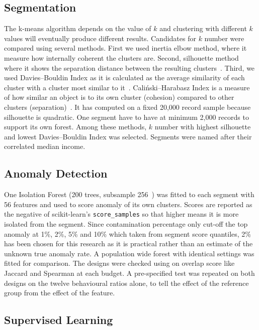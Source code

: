 \subsection{Segmentation}

The k-means algorithm depends on the value of $k$ and clustering with different $k$ values will eventually produce different results. Candidates for $k$ number were compared using several methods. First we used inertia elbow method, where it measure how internally coherent the clusters are. Second, silhouette method where it shows the separation distance between the resulting clusters~\cite{rousseeuw1987silhouettes}. Third, we used Davies--Bouldin Index as it is calculated as the average similarity of each cluster with a cluster most similar to it~\cite{davies1979cluster}. Cali\'nski--Harabasz Index is a measure of how similar an object is to its own cluster (cohesion) compared to other clusters (separation)~\cite{calinski1974dendrite}. It has computed on a fixed 20,000 record sample because silhouette is quadratic. One segment have to have at minimum 2,000 records to support its own forest. Among these methods, $k$ number with highest silhouette and lowest Davies--Bouldin Index was selected. Segments were named after their correlated median income.

\subsection{Anomaly Detection}

One Isolation Forest (200 trees, subsample 256~\cite{liu2008isolation}) was fitted to each segment with 56 features and used to score anomaly of its own clusters. Scores are reported as the negative of scikit-learn's \texttt{score\_samples} so that higher means it is more isolated from the segment. Since contamination percentage only cut-off the top anomaly at 1\%, 2\%, 5\% and 10\% which taken from segment score quantiles, 2\% has been chosen for this research as it is practical rather than an estimate of the unknown true anomaly rate. A population wide forest with identical settings was fitted for comparison. The designs were checked using on overlap score like Jaccard and Spearman at each budget. A pre-specified test was repeated on both designs on the twelve behavioural ratios alone, to tell the effect of the reference group from the effect of the feature.

\subsection{Supervised Learning}

